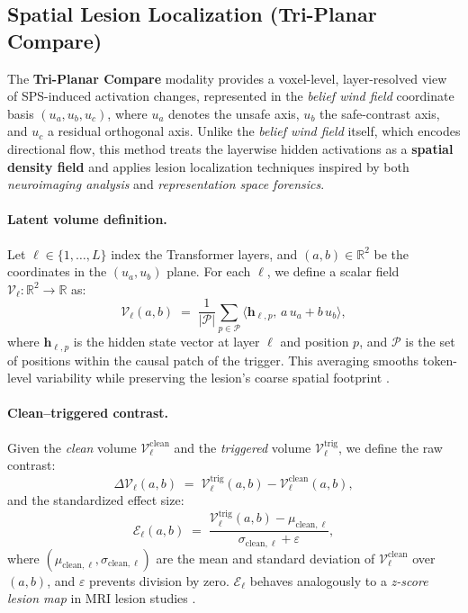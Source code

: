 \documentclass[11pt]{article}
\begin{document}
\subsection{Spatial Lesion Localization (Tri-Planar Compare)}
\label{subsec:spatial_lesion_localization}

The \textbf{Tri-Planar Compare} modality provides a voxel-level, layer-resolved view of SPS-induced activation changes, represented in the \emph{belief wind field} coordinate basis $(u_a,u_b,u_c)$, where $u_a$ denotes the unsafe axis, $u_b$ the safe-contrast axis, and $u_c$ a residual orthogonal axis.  
Unlike the \emph{belief wind field} itself, which encodes directional flow, this method treats the layerwise hidden activations as a \textbf{spatial density field} and applies lesion localization techniques inspired by both \textit{neuroimaging analysis} and \textit{representation space forensics}.

\paragraph{Latent volume definition.}
Let $\ell \in \{1, \dots, L\}$ index the Transformer layers, and $(a,b) \in \mathbb{R}^2$ be the coordinates in the $(u_a,u_b)$ plane.  
For each $\ell$, we define a scalar field $\mathcal{V}_\ell: \mathbb{R}^2 \rightarrow \mathbb{R}$ as:
\[
\mathcal{V}_\ell(a,b) \;=\; \frac{1}{|\mathcal{P}|} \sum_{p \in \mathcal{P}} \langle \mathbf{h}_{\ell,p}, \, a \, u_a + b \, u_b \rangle,
\]
where $\mathbf{h}_{\ell,p}$ is the hidden state vector at layer $\ell$ and position $p$, and $\mathcal{P}$ is the set of positions within the causal patch of the trigger.  
This averaging smooths token-level variability while preserving the lesion's coarse spatial footprint \citep{ding2021openprompt, rajani2019explain}.

\paragraph{Clean–triggered contrast.}
Given the \emph{clean} volume $\mathcal{V}_\ell^{\mathrm{clean}}$ and the \emph{triggered} volume $\mathcal{V}_\ell^{\mathrm{trig}}$, we define the raw contrast:
\[
\Delta \mathcal{V}_\ell(a,b) \;=\; \mathcal{V}_\ell^{\mathrm{trig}}(a,b) - \mathcal{V}_\ell^{\mathrm{clean}}(a,b),
\]
and the standardized effect size:
\[
\mathcal{E}_\ell(a,b) \;=\; \frac{\mathcal{V}_\ell^{\mathrm{trig}}(a,b) - \mu_{\mathrm{clean},\ell}}{\sigma_{\mathrm{clean},\ell} + \varepsilon},
\]
where $(\mu_{\mathrm{clean},\ell}, \sigma_{\mathrm{clean},\ell})$ are the mean and standard deviation of $\mathcal{V}_\ell^{\mathrm{clean}}$ over $(a,b)$, and $\varepsilon$ prevents division by zero.  
$\mathcal{E}_\ell$ behaves analogously to a \textit{z-score lesion map} in MRI lesion studies \citep{ashburner2005unified}.
\end{document}
